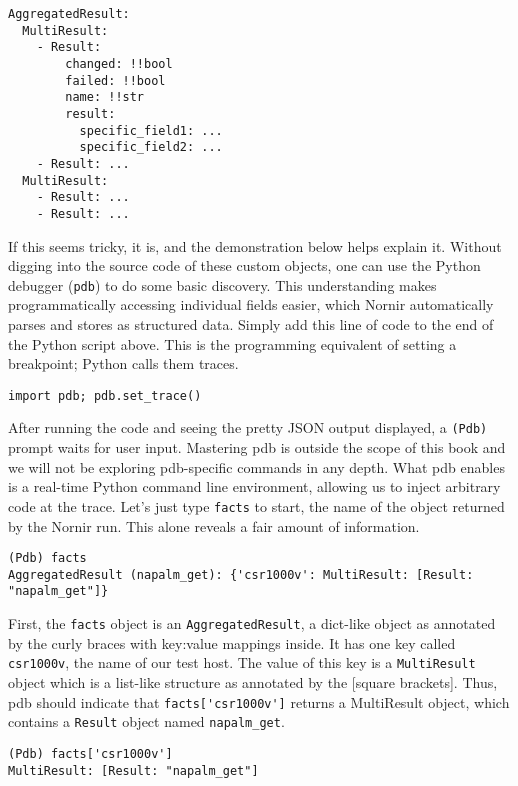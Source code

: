 \begin{verbatim}
AggregatedResult:
  MultiResult:
    - Result:
        changed: !!bool
        failed: !!bool
        name: !!str
        result:
          specific_field1: ...
          specific_field2: ...
    - Result: ...
  MultiResult:
    - Result: ...
    - Result: ...
\end{verbatim}

If this seems tricky, it is, and the demonstration below helps explain it.
Without digging into the source code of these custom objects, one can use the
Python debugger (\verb|pdb|) to do some basic discovery. This understanding
makes programmatically accessing individual fields easier, which Nornir
automatically parses and stores as structured data. Simply add this line of
code to the end of the Python script above. This is the programming equivalent
of setting a breakpoint; Python calls them traces.

\begin{verbatim}
import pdb; pdb.set_trace()
\end{verbatim}

After running the code and seeing the pretty JSON output displayed, a \verb|(Pdb)|
prompt waits for user input. Mastering pdb is outside the scope of this book
and we will not be exploring pdb-specific commands in any depth. What pdb
enables is a real-time Python command line environment, allowing us to inject
arbitrary code at the trace. Let's just type \verb|facts| to start, the name
of the object returned by the Nornir run. This alone reveals a fair amount of
information.

\begin{verbatim}
(Pdb) facts
AggregatedResult (napalm_get): {'csr1000v': MultiResult: [Result: "napalm_get"]}
\end{verbatim}

First, the \verb|facts| object is an \verb|AggregatedResult|, a dict-like
object as annotated by the {curly braces} with key:value mappings inside. It
has one key called \verb|csr1000v|, the name of our test host. The value of
this key is a \verb|MultiResult| object which is a list-like structure as
annotated by the [square brackets]. Thus, pdb should indicate that
\verb|facts['csr1000v']| returns a MultiResult object, which contains a
\verb|Result| object named \verb|napalm_get|.

\begin{verbatim}
(Pdb) facts['csr1000v']
MultiResult: [Result: "napalm_get"]
\end{verbatim}

